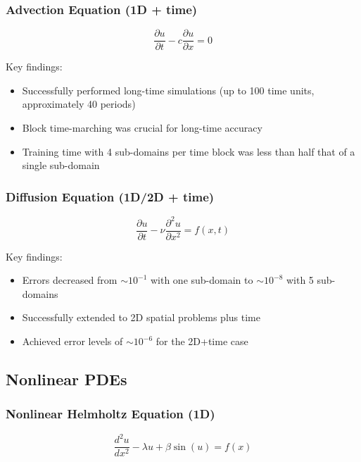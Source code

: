 \documentclass[11pt,a4paper]{article}
\begin{document}
\subsubsection{Advection Equation (1D + time)}
\begin{equation}
    \frac{\partial u}{\partial t} - c\frac{\partial u}{\partial x} = 0
\end{equation}

Key findings:
\begin{itemize}
    \item Successfully performed long-time simulations (up to 100 time units, approximately 40 periods)
    \item Block time-marching was crucial for long-time accuracy
    \item Training time with 4 sub-domains per time block was less than half that of a single sub-domain
\end{itemize}

\subsubsection{Diffusion Equation (1D/2D + time)}
\begin{equation}
    \frac{\partial u}{\partial t} - \nu \frac{\partial^2 u}{\partial x^2} = f(x,t)
\end{equation}

Key findings:
\begin{itemize}
    \item Errors decreased from $\sim 10^{-1}$ with one sub-domain to $\sim 10^{-8}$ with 5 sub-domains
    \item Successfully extended to 2D spatial problems plus time
    \item Achieved error levels of $\sim 10^{-6}$ for the 2D+time case
\end{itemize}

\subsection{Nonlinear PDEs}

\subsubsection{Nonlinear Helmholtz Equation (1D)}
\begin{equation}
    \frac{d^2u}{dx^2} - \lambda u + \beta \sin(u) = f(x)
\end{equation}
\end{document}
